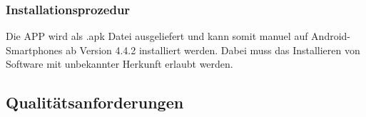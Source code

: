 


\subsubsection{Installationsprozedur}

Die \acs{APP} wird als .apk Datei ausgeliefert und kann somit manuel auf Android-Smartphones ab Version 4.4.2 installiert werden.
Dabei muss das Installieren von Software mit unbekannter Herkunft erlaubt werden.


%










\subsection{\textbf{Qualitätsanforderungen}}

